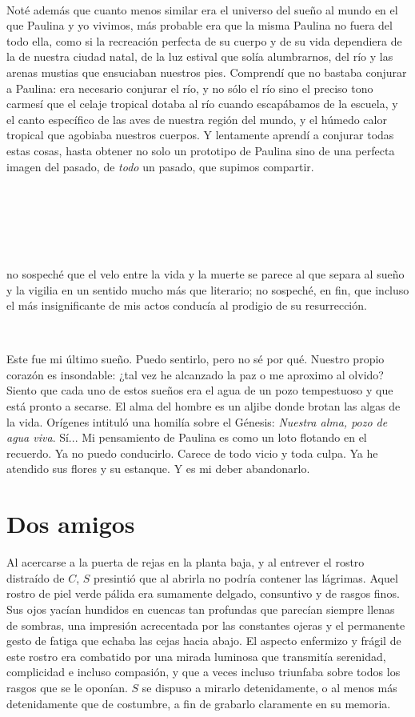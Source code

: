 \documentclass[a4paper, 12pt]{article}
\begin{document}
~

Noté además que cuanto menos similar era el universo del sueño al mundo en el
que Paulina y yo vivimos, más probable era que la misma Paulina no fuera del
todo ella, como si la recreación perfecta de su cuerpo y de su vida dependiera
de la de nuestra ciudad natal, de la luz estival que solía alumbrarnos, del río
y las arenas mustias que ensuciaban nuestros pies. Comprendí que no bastaba
conjurar a Paulina: era necesario conjurar el río, y no sólo el río sino el
preciso tono carmesí que el celaje tropical dotaba al río cuando escapábamos de
la escuela, y el canto específico de las aves de nuestra región del mundo, y el
húmedo calor tropical que agobiaba nuestros cuerpos. Y lentamente aprendí a
conjurar todas estas cosas, hasta obtener no solo un prototipo de Paulina sino
de una perfecta imagen del pasado, de \textit{todo} un pasado, que supimos
compartir.

~



~

~ 


\pagebreak 


no sospeché que el velo entre la
vida y la muerte se parece al que separa al sueño y la vigilia en un sentido
mucho más que literario; no sospeché, en fin, que incluso el más insignificante
de mis actos conducía al prodigio de su resurrección.


~



Este fue mi último sueño. Puedo sentirlo, pero no sé por qué. Nuestro propio
corazón es insondable: ¿tal vez he alcanzado la paz o me aproximo al olvido?
Siento que cada uno de estos sueños era el agua de un pozo tempestuoso y que
está pronto a secarse. El alma del hombre es un aljibe donde brotan las algas de
la vida. Orígenes intituló una homilía sobre el Génesis: \textit{Nuestra alma,
pozo de agua viva}. Sí... Mi pensamiento de Paulina es como un loto flotando en
el recuerdo. Ya no puedo conducirlo. Carece de todo vicio y toda culpa. Ya he
atendido sus flores y su estanque. Y es mi deber abandonarlo.


\pagebreak 

\section*{Dos amigos}

Al acercarse a la puerta de rejas en la planta baja, y al entrever el rostro
distraído de $C$, $S$ presintió que al abrirla no podría contener las lágrimas.
Aquel rostro de piel verde pálida era sumamente delgado, consuntivo y de rasgos
finos. Sus ojos yacían hundidos en cuencas tan profundas que parecían siempre
llenas de sombras, una impresión acrecentada por las constantes ojeras y el
permanente gesto de fatiga que echaba las cejas hacia abajo. El aspecto
enfermizo y frágil de este rostro era combatido por una mirada luminosa que
transmitía serenidad, complicidad e incluso compasión, y que a veces incluso
triunfaba sobre todos los rasgos que se le oponían. $S$ se dispuso a mirarlo
detenidamente, o al menos más detenidamente que de costumbre, a fin de grabarlo
claramente en su memoria.
\end{document}
